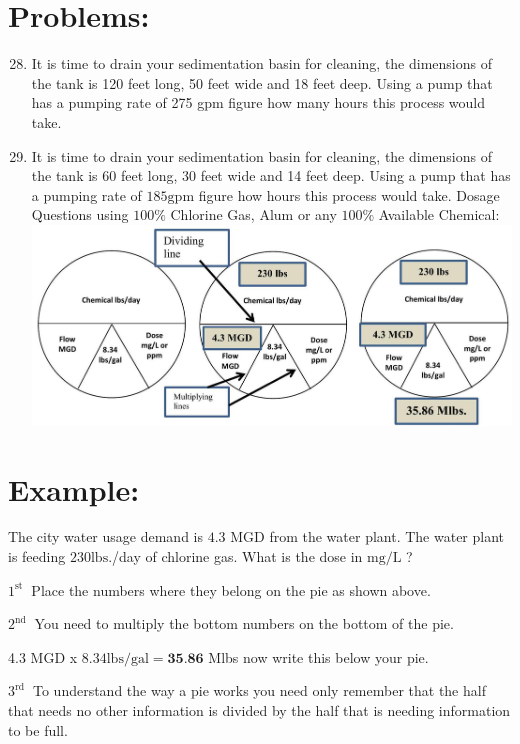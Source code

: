 \documentclass[10pt]{article}
\begin{document}
\section{Problems:}
\begin{enumerate}
  \setcounter{enumi}{27}
  \item It is time to drain your sedimentation basin for cleaning, the dimensions of the tank is 120 feet long, 50 feet wide and 18 feet deep. Using a pump that has a pumping rate of 275 gpm figure how many hours this process would take.

  \item It is time to drain your sedimentation basin for cleaning, the dimensions of the tank is 60 feet long, 30 feet wide and 14 feet deep. Using a pump that has a pumping rate of $185 \mathrm{gpm}$ figure how hours this process would take. Dosage Questions using $100 \%$ Chlorine Gas, Alum or any $100 \%$ Available Chemical:\\

\includegraphics[max width=\textwidth]{2022_09_16_0c6b804a9b26a8df4e8fg-07}

\end{enumerate}
\section{Example:}
The city water usage demand is $4.3$ MGD from the water plant. The water plant is feeding $230 \mathrm{lbs}$./day of chlorine gas. What is the dose in $\mathrm{mg} / \mathrm{L}$ ?

$1^{\text {st }}$ Place the numbers where they belong on the pie as shown above.

$2^{\text {nd }}$ You need to multiply the bottom numbers on the bottom of the pie.

4.3 MGD x $8.34 \mathrm{lbs} / \mathrm{gal}=\mathbf{3 5 . 8 6}$ Mlbs now write this below your pie.

$3^{\text {rd }}$ To understand the way a pie works you need only remember that the half that needs no other information is divided by the half that is needing information to be full.
\end{document}
